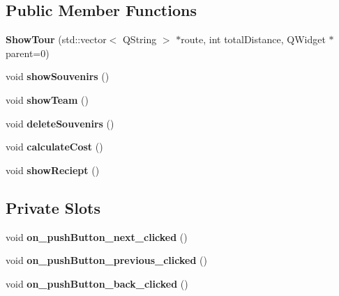 \subsection*{Public Member Functions}
\begin{DoxyCompactItemize}
\item 
\mbox{\label{class_show_tour_a6c9590dd98ca0edd65faef7bc4a209ef}} 
{\bfseries Show\+Tour} (std\+::vector$<$ Q\+String $>$ $\ast$route, int total\+Distance, Q\+Widget $\ast$parent=0)
\item 
\mbox{\label{class_show_tour_aecb0217838a57e284d9a807e2e80f921}} 
void {\bfseries show\+Souvenirs} ()
\item 
\mbox{\label{class_show_tour_a9887b15275c0468c0655265c2582fe46}} 
void {\bfseries show\+Team} ()
\item 
\mbox{\label{class_show_tour_a2b053259b897159792bb6fd39059e23c}} 
void {\bfseries delete\+Souvenirs} ()
\item 
\mbox{\label{class_show_tour_ae42b7dcb12eb72ba434e126c1b17876e}} 
void {\bfseries calculate\+Cost} ()
\item 
\mbox{\label{class_show_tour_aeb8662e97c27d7bae6c0b2ce5f73506d}} 
void {\bfseries show\+Reciept} ()
\end{DoxyCompactItemize}
\subsection*{Private Slots}
\begin{DoxyCompactItemize}
\item 
\mbox{\label{class_show_tour_a0fefead1ef0524fb04dbe47d1cf1db44}} 
void {\bfseries on\+\_\+push\+Button\+\_\+next\+\_\+clicked} ()
\item 
\mbox{\label{class_show_tour_ad13ddb720ac5be12ff656225230abda6}} 
void {\bfseries on\+\_\+push\+Button\+\_\+previous\+\_\+clicked} ()
\item 
\mbox{\label{class_show_tour_aa964b52a3be85bc9347753d82cd8a684}} 
void {\bfseries on\+\_\+push\+Button\+\_\+back\+\_\+clicked} ()
\end{DoxyCompactItemize}
